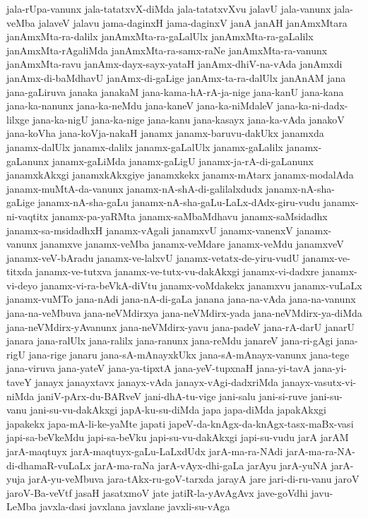 {jala-rUpa-vanunx
jala-tatatxvX-diMda
jala-tatatxvXvu
jalavU
jala-vanunx
jala-veMba
jalaveV
jalavu
jama-daginxH
jama-daginxV
janA
janAH
janAmxMtara
janAmxMta-ra-dalilx
janAmxMta-ra-gaLalUlx
janAmxMta-ra-gaLalilx
janAmxMta-rAgaliMda
janAmxMta-ra-samx-raNe
janAmxMta-ra-vanunx
janAmxMta-ravu
janAmx-dayx-sayx-yataH
janAmx-dhiV-na-vAda
janAmxdi
janAmx-di-baMdhavU
janAmx-di-gaLige
janAmx-ta-ra-dalUlx
janAnAM
jana
jana-gaLiruva
janaka
janakaM
jana-kama-hA-rA-ja-nige
jana-kanU
jana-kana
jana-ka-nanunx
jana-ka-neMdu
jana-kaneV
jana-ka-niMdaleV
jana-ka-ni-dadx-lilxge
jana-ka-nigU
jana-ka-nige
jana-kanu
jana-kasayx
jana-ka-vAda
janakoV
jana-koVha
jana-koVja-nakaH
janamx
janamx-baruvu-dakUkx
janamxda
janamx-dalUlx
janamx-dalilx
janamx-gaLalUlx
janamx-gaLalilx
janamx-gaLanunx
janamx-gaLiMda
janamx-gaLigU
janamx-ja-rA-di-gaLanunx
janamxkAkxgi
janamxkAkxgiye
janamxkekx
janamx-mAtarx
janamx-modalAda
janamx-muMtA-da-vanunx
janamx-nA-shA-di-galilalxdudx
janamx-nA-sha-gaLige
janamx-nA-sha-gaLu
janamx-nA-sha-gaLu-LaLx-dAdx-giru-vudu
janamx-ni-vaqtitx
janamx-pa-yaRMta
janamx-saMbaMdhavu
janamx-saMsidadhx
janamx-sa-msidadhxH
janamx-vAgali
janamxvU
janamx-vanenxV
janamx-vanunx
janamxve
janamx-veMba
janamx-veMdare
janamx-veMdu
janamxveV
janamx-veV-bAradu
janamx-ve-lalxvU
janamx-vetatx-de-yiru-vudU
janamx-ve-titxda
janamx-ve-tutxva
janamx-ve-tutx-vu-dakAkxgi
janamx-vi-dadxre
janamx-vi-deyo
janamx-vi-ra-beVkA-diVtu
janamx-voMdakekx
janamxvu
janamx-vuLaLx
janamx-vuMTo
jana-nAdi
jana-nA-di-gaLa
janana
jana-na-vAda
jana-na-vanunx
jana-na-veMbuva
jana-neVMdirxya
jana-neVMdirx-yada
jana-neVMdirx-ya-diMda
jana-neVMdirx-yAvanunx
jana-neVMdirx-yavu
jana-padeV
jana-rA-darU
janarU
janara
jana-ralUlx
jana-ralilx
jana-ranunx
jana-reMdu
janareV
jana-ri-gAgi
jana-rigU
jana-rige
janaru
jana-sA-mAnayxkUkx
jana-sA-mAnayx-vanunx
jana-tege
jana-viruva
jana-yateV
jana-ya-tipxtA
jana-yeV-tupxnaH
jana-yi-tavA
jana-yi-taveY
janayx
janayxtavx
janayx-vAda
janayx-vAgi-dadxriMda
janayx-vasutx-vi-niMda
janiV-pArx-du-BARveV
jani-dhA-tu-vige
jani-salu
jani-si-ruve
jani-su-vanu
jani-su-vu-dakAkxgi
japA-ku-su-diMda
japa
japa-diMda
japakAkxgi
japakekx
japa-mA-li-ke-yaMte
japati
japeV-da-knAgx-da-knAgx-tasx-maBx-vasi
japi-sa-beVkeMdu
japi-sa-beVku
japi-su-vu-dakAkxgi
japi-su-vudu
jarA
jarAM
jarA-maqtuyx
jarA-maqtuyx-gaLu-LaLxdUdx
jarA-ma-ra-NAdi
jarA-ma-ra-NA-di-dhamaR-vuLaLx
jarA-ma-raNa
jarA-vAyx-dhi-gaLa
jarAyu
jarA-yuNA
jarA-yuja
jarA-yu-veMbuva
jara-tAkx-ru-goV-tarxda
jarayA
jare
jari-di-ru-vanu
jaroV
jaroV-Ba-veVtf
jasaH
jasatxmoV
jate
jatiR-la-yAvAgAvx
jave-goVdhi
javu-LeMba
javxla-dasi
javxlana
javxlane
javxli-su-vAga
}
